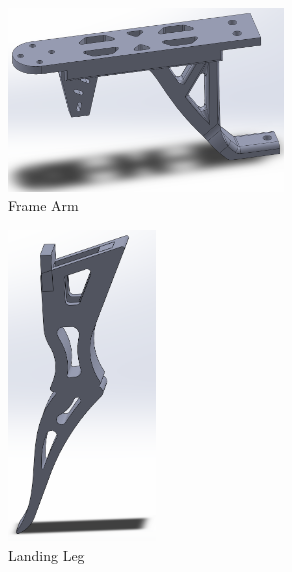 \documentclass[12pt, titlepage]{article}
\begin{document}
\begin{figure}[h!]
  \begin{center} 
  \caption{Frame Arm}
  \label{Frame Arm}
        \includegraphics[width=0.65\textwidth]{CAD_Arm.png}
  \end{center}
\end{figure}

\begin{figure}[h!]
  \begin{center} 
  \caption{Landing Leg}
  \label{Landing Leg}
        \includegraphics[width=0.35\textwidth]{CAD_Leg.png}
  \end{center}
\end{figure}
\end{document}
